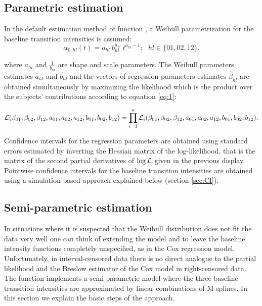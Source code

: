 \documentclass[article]{jss}
\begin{document}
\subsection{Parametric estimation}
\label{sec-3-1}

In the default estimation method of function , a Weibull
parametrization for the baseline transition intensities is assumed: 
\begin{equation*}
\alpha_{0,hl}(t)= a_{hl} ~ b_{hl}^{a_{hl}} ~ t^{a_{hl}-1}; ~~~ hl \in
\{01,02,12\}.
\end{equation*}

where \(a_{hl}\) and \(\frac{1}{b_{hl}}\) are shape and scale
parameters.  The Weibull parameters estimates \(\hat{a}_{hl}\) and \(\hat{b}_{hl}\) and the
vectors of regression parameters estimates \(\hat \beta_{hl}\) are obtained
simultaneously by maximizing the likelihood which is the product over the
subjects' contributions according to equation \ref{eq:1}:


\begin{equation*}
{\cal{L}}(\beta_{01},\beta_{02},\beta_{12},a_{01},a_{02},a_{12},b_{01},b_{02},b_{12})
= \prod_{i=1}^n{\cal{L}}_i(\beta_{01},\beta_{02},\beta_{12},a_{01},a_{02},a_{12},b_{01},b_{02},b_{12}).
\end{equation*}


Confidence intervals for the regression parameters are obtained using
standard errors estimated by inverting the Hessian matrix of the
log-likelihood, that is the matrix of the second partial derivatives
of \(\log{\cal L}\) given in the previous display. Pointwise confidence intervals for
the baseline transition intensities are obtained using a
simulation-based approach explained below (section \ref{sec:CI}).

\subsection{Semi-parametric estimation}
\label{sec-3-2}
\label{sec:semi-para}

In situations where it is suspected that the Weibull distribution does
not fit the data very well one can think of extending the model and to
leave the baseline intensity functions completely unspecified, as in
the Cox regression model. Unfortunately, in interval-censored data
there is no direct analogue to the partial likelihood and the Breslow
estimator of the Cox model in right-censored data. 
The function  implements a
semi-parametric model where the three baseline transition intensities
are approximated by linear combinations of M-splines. In this section
we explain the basic steps of the approach.
\end{document}
